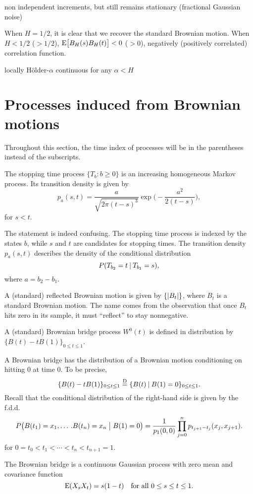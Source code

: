 non independent increments, but still remains stationary (fractional Gaussian noise)

When $H = 1/2$, it is clear that we recover the standard Brownian motion.
When $H < 1/2$ ($> 1/2$), $\mathop{}\!\mathrm{E} \bigl[B_H(s)B_H(t)\bigr] < 0$ ($>0$), negatively (positively correlated) correlation function.

locally Hölder-$\alpha$ continuous for any $\alpha < H$

\section{Processes induced from Brownian motions}
Throughout this section, the time index of processes will be in the parentheses instead of the subscripts.

The stopping time process $\{T_b : b\geq 0\}$ is an increasing homogeneous Markov process. Its transition density is given by \[
    p_{a}(s,t) = \frac{a}{\sqrt{2\pi (t-s)^3}} \exp\biggl(-\frac{a^2}{2(t-s)}\biggr), 
\] for $s < t$.

The statement is indeed confusing. The stopping time process is indexed by the states $b$, while $s$ and $t$ are candidates for stopping times. The transition density $p_{a}(s,t)$ describes the density of the conditional distribution \[
    P(T_{b_2} = t \mathbin{|} T_{b_1} = s),
\] where $a = b_2 - b_1$.

A (standard) reflected Brownian motion is given by $\{\lvert B_t \rvert\}$, where $B_t$ is a standard Brownian motion. The name comes from the observation that once $B_t$ hits zero in its sample, it must ``reflect'' to stay nonnegative.

A (standard) Brownian bridge process $W^0(t)$ is defined in distribution by $\{B(t) - tB(1)\}_{0\leq t \leq 1}$. 

\begin{prop}
    A Brownian bridge has the distribution of a Brownian motion conditioning on hitting $0$ at time $0$. To be precise, \[
        \{B(t) - tB(1)\}_{0\leq t \leq 1} \stackrel{\mathrm{D}}{=} \{B(t) \mathbin{|} B(1) = 0\}_{0\leq t \leq 1}.
    \] Recall that the conditional distribution of the right-hand side is given by the f.d.d.\ \[
        P\bigl(B(t_1) = x_1, \dotsc.B(t_n) = x_n \bigm\vert B(1) = 0\bigr) = \frac{1}{p_1(0,0)} \prod_{j = 0}^{n}p_{t_{j+1} - t_{j}}(x_j,x_{j+1}).
    \] for $0 = t_0 < t_1 < \dotsb < t_n  < t_{n+1}= 1$.
    
\end{prop}

\begin{prop}
    The Brownian bridge is a continuous Gaussian process with zero mean and covariance function \[
        \mathop{}\!\mathrm{E}(X_s X_t) = s(1 - t)\quad \text{for all }0\leq s \leq t \leq 1.
    \]
\end{prop}

